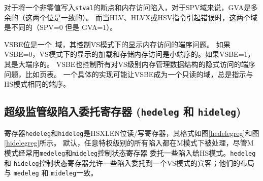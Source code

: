 \begin{commentary}
  对于将一个非零值写入{\tt stval}的断点和内存访问陷入，对于SPV域来说，GVA是多余的（这两个位是一致的）。
  而当HLV、HLVX或HSV指令引起错误时，这两个域是不同的（SPV=0 但是 GVA=1）。
\end{commentary}

VSBE位是一个\warl\ 域，其控制VS模式下的显示内存访问的端序问题。
如果VSBE=0，VS模式下的显示的加载和存储内存访问是小端序的。如果VSBE=1，其是大端序的。
VSBE也控制所有对VS级别内存管理数据结构的隐式访问的端序问题，比如页表。
一个具体的实现可能让VSBE成为一个只读的域，总是指示与HS模式相同的端序。

\subsection{超级监管级陷入委托寄存器 ({\tt hedeleg} 和 {\tt hideleg})}

寄存器{\tt hedeleg}和{\tt hideleg}是HSXLEN位读/写寄存器，其格式如图\ref{hedelegreg}和图\ref{hidelegreg}所示。
默认，任意特权级别的所有陷入都在M模式下被处理，尽管M模式经常用{\tt medeleg}和{\tt mideleg}控制状态寄存器
委托一些陷入给HS模式。{\tt hedeleg} 和 {\tt hideleg}控制状态寄存器允许一些陷入委托到一个VS模式的宾客；他们的布局与
{\tt medeleg} 和 {\tt mideleg}一致。

